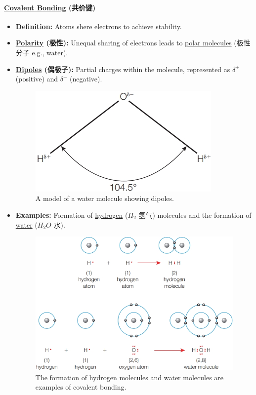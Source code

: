 \paragraph{\underline{Covalent Bonding} (共价键)}
\begin{itemize}
    \item \textbf{Definition:} Atoms shere electrons to achieve stability.
    \item \textbf{\underline{Polarity} (极性):} Unequal sharing of electrons leads to \underline{polar molecules} (极性分子 e.g.,
    water).
    \item \textbf{\underline{Dipoles} (偶极子):} Partial charges within the molecule, represented as $\delta^+$ (positive) and
    $\delta^-$ (negative).
    \begin{figure}[H]
        \centering
        \includegraphics[scale=0.35]{Biology/1A/Images/1A-1-3.png}
        \caption{A model of a water molecule showing dipoles.}
    \end{figure}
    \item \textbf{Examples:} Formation of \underline{hydrogen} ($H_2$ 氢气) molecules and the formation of \underline{water}
    ($H_2O$ 水).
    \begin{figure}[H]
        \centering
        \includegraphics[scale=0.3]{Biology/1A/Images/1A-1-2.png}
        \caption{The formation of hydrogen molecules and water molecules are examples of covalent bonding.}
    \end{figure}
\end{itemize}

